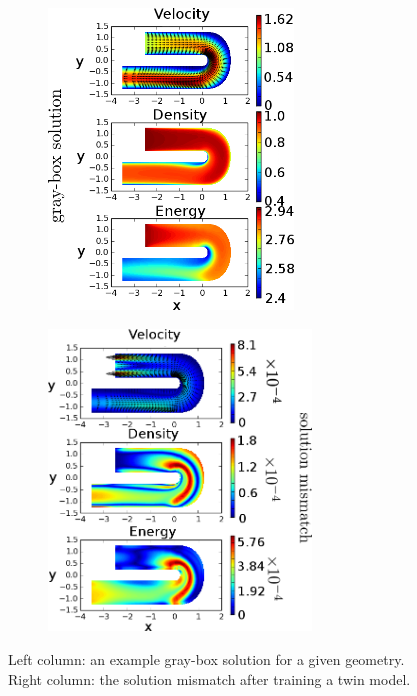 
\begin{figure}[htbp]\begin{center}
    \begin{subfigure}[t]{.49\textwidth}
        \centering
        \includegraphics[height=8cm]{../graysol_Ubend.png}
        \label{fig: graysol Ubend}
    \end{subfigure}
    \begin{subfigure}[t]{.49\textwidth}
        \centering
        \includegraphics[height=8cm]{../err_Ubend.png}
        \label{fig: errsol Ubend}
    \end{subfigure}
    \caption{Left column: an example gray-box solution for a given geometry. Right column:
             the solution mismatch after training a twin model.}
    \label{fig: grayErrSol Ubend}
\end{center}\end{figure}

